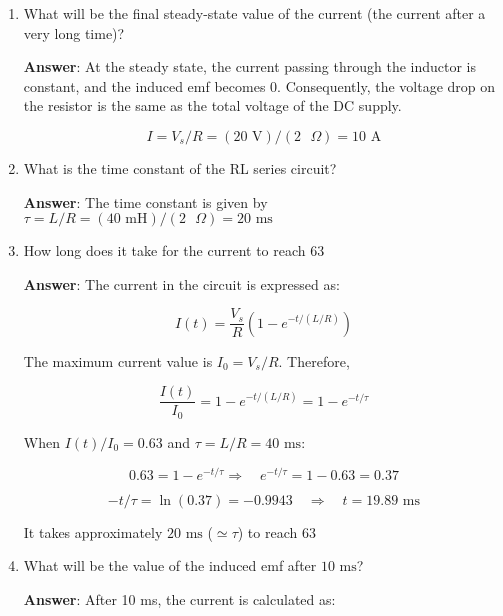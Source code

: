 \documentclass{article}
\begin{document}
\begin{enumerate}

  \item What will be the final steady-state value of the current (the current after a very long time)?

        \ifsolutions
        \textbf{Answer}: At the steady state, the current passing through the inductor is constant, and the induced emf becomes 0. Consequently, the voltage drop on the resistor is the same as the total voltage of the DC supply.

        $$I = V_s/R=(20\text{ V})/(2\text{ }\Omega) = 10\text{ A}$$
        \else
        \vskip 60pt
        \fi

  \item What is the time constant of the RL series circuit?

        \ifsolutions
        \textbf{Answer}: The time constant is given by $\tau = L/R = (40\text{ mH})/(2\text{ }\Omega) = 20 \text{ ms}$
        \else
        \vskip 60pt
        \fi

  \item How long does it take for the current to reach 63%

        \ifsolutions
        \textbf{Answer}: The current in the circuit is expressed as:

        $$I(t) = \frac{V_s}{R}\left(1-e^{-t/(L/R)}\right)$$

        The maximum current value is $I_0=V_s/R$. Therefore,

        $$\frac{I(t)}{I_0} = 1-e^{-t/(L/R)} = 1-e^{-t/\tau}$$

        When $I(t)/I_0 =0.63$ and $\tau = L/R = 40\text{ ms}$:

        $$0.63 = 1-e^{-t/\tau}\Rightarrow\quad e^{-t/\tau} = 1-0.63 = 0.37$$

        $$-t/\tau = \ln(0.37) = -0.9943\quad\Rightarrow\quad t = 19.89\text{ ms}$$

        It takes approximately $20\text{ ms}$ ($\simeq \tau$) to reach $63$%
        \else
        \vskip 60pt
        \fi

  \item What will be the value of the induced emf after $10\text{ ms}$?

        \ifsolutions
        \textbf{Answer}: After 10 ms, the current is calculated as:


\end{enumerate}
\end{document}

